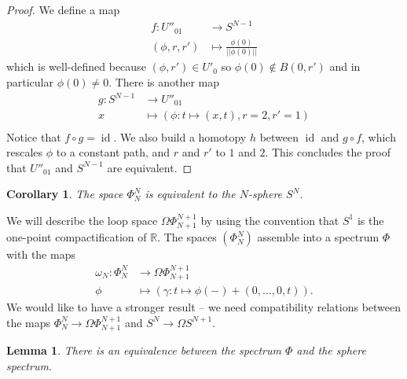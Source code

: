 \documentclass[12pt]{amsart}
\theoremstyle{plain}
\newtheorem{cor}[teo]{Corollary}
\newtheorem{lem}[teo]{Lemma}
\theoremstyle{definition}
\theoremstyle{remark}
\DeclareMathOperator{\id}{id}
\begin{document}
    \begin{proof}
    We define a map 
    \begin{align*}
    f: U''_{01} &\rightarrow S^{N-1}\\
    (\phi,r,r') &\mapsto \frac{\phi(0)}{\vert\vert\phi(0)\vert\vert}
    \end{align*}
    which is well-defined because $(\phi,r')\in U'_0$ so $\phi(0)\notin B(0,r')$ and in particular $\phi(0)\neq 0$.
    There is another map 
    \begin{align*}
    g: S^{N-1} &\rightarrow U''_{01}\\
    x &\mapsto (\phi:t\mapsto (x,t),r=2,r'=1)\\
    \end{align*}
    Notice that $f\circ g = \id$. 
    We also build a homotopy $h$ between $\id$ and $g\circ f$, which rescales $\phi$ to a constant path, and $r$ and $r'$ to $1$ and $2$.
    This concludes the proof that $U''_{01}$ and $S^{N-1}$ are equivalent.
    \end{proof}
 
\begin{cor}\label{finaldelooping}
The space $\Phi_N^N$ is equivalent to the $N$-sphere $S^N$.
\end{cor}

We will describe the loop space $\Omega\Phi_{N+1}^{N+1}$ by using the convention that $S^1$ is the one-point compactification of $\mathbb{R}$.
The spaces $(\Phi_N^N)$ assemble into a spectrum $\Phi$ with the maps
\begin{align*}
    \omega_N: \Phi_N^N&\rightarrow \Omega \Phi_{N+1}^{N+1}\\
    \phi &\mapsto (\gamma : t\mapsto \phi(-)+(0,\dots,0,t)). 
\end{align*}
We would like to have a stronger result -- we need compatibility relations between the maps $\Phi_N^N\rightarrow \Omega \Phi_{N+1}^{N+1}$ and $S^N\rightarrow \Omega S^{N+1}$.
\begin{lem}\label{spectrumeq}
    There is an equivalence between the spectrum $\Phi$ and the sphere spectrum.
\end{lem}
\end{document}

